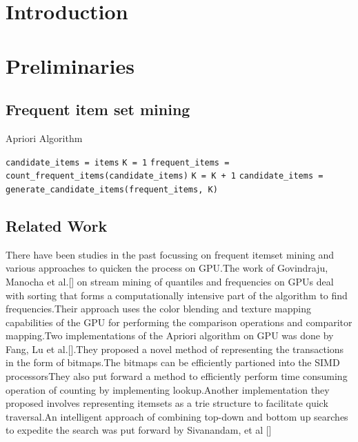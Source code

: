 \documentclass[conference]{IEEEtran}
\begin{document}




%
\IEEEpeerreviewmaketitle



\section{Introduction}

\section{Preliminaries}

\subsection{Frequent item set mining}

\begin{algorithm}\caption{Apriori Algorithm}\label{alg:apriori}
  \begin{algorithmic}[1]
	\STATE \texttt{candidate\_items = items}
	\STATE \texttt{K = 1}
	    \STATE \texttt{frequent\_items = count\_frequent\_items(candidate\_items)}
			\STATE \texttt{K = K + 1}
	    \STATE \texttt {candidate\_items = generate\_candidate\_items(frequent\_items, K)}
    \ENDWHILE
  \end{algorithmic}
\end{algorithm}



\subsection{Related Work}
There have been studies in the past focussing on frequent itemset mining and various approaches to quicken the process on GPU.The work of Govindraju, Manocha et al.[] on stream mining of quantiles and frequencies on GPUs deal with sorting that forms a computationally intensive part of the algorithm to find frequencies.Their approach uses the color blending and texture mapping capabilities of the GPU for performing the comparison operations and comparitor mapping.Two implementations of the Apriori algorithm on GPU was done by Fang, Lu et al.[].They proposed a novel method of representing the transactions in the form of bitmaps.The bitmaps can be efficiently partioned into the SIMD processorsThey also put forward a method to efficiently perform time consuming operation of counting by implementing lookup.Another implementation they proposed involves representing itemsets as a trie structure to facilitate quick traversal.An intelligent approach of combining top-down and bottom up searches to expedite the search was put forward by Sivanandam, et al [] 
\end{document}
